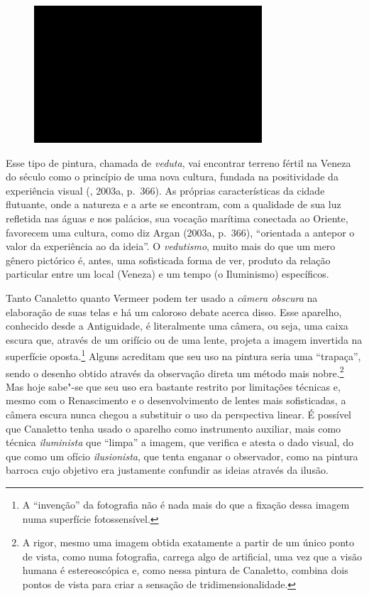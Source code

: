 \begin{figure}[!ht]
\centering
 \includegraphics[width=85mm]{./imgs/im1.jpg}
\caption{\tiny{}}
\end{figure}

Esse tipo de pintura, chamada de \emph{veduta}, vai encontrar terreno
fértil na Veneza do século  como o princípio de uma nova cultura,
fundada na positividade da experiência visual (, 2003a, p.~366). As
próprias características da cidade flutuante, onde a natureza e a arte
se encontram, com a qualidade de sua luz refletida nas águas e nos
palácios, sua vocação marítima conectada ao Oriente, favorecem uma
cultura, como diz Argan (2003a, p.~366), ``orientada a antepor o valor
da experiência ao da ideia''. O \emph{vedutismo}, muito mais do que um
mero gênero pictórico é, antes, uma sofisticada forma de ver, produto da
relação particular entre um local (Veneza) e um tempo (o Iluminismo)
específicos.

Tanto Canaletto quanto Vermeer podem ter usado a \emph{câmera obscura}
na elaboração de suas telas e há um caloroso debate acerca disso. Esse
aparelho, conhecido desde a Antiguidade, é literalmente uma câmera, ou
seja, uma caixa escura que, através de um orifício ou de uma lente,
projeta a imagem invertida na superfície oposta.\footnote{A ``invenção''
  da fotografia não é nada mais do que a fixação dessa imagem numa
  superfície fotossensível.} Alguns acreditam que seu uso na pintura
seria uma ``trapaça'', sendo o desenho obtido através da observação
direta um método mais nobre.\footnote{A rigor, mesmo uma imagem obtida
  exatamente a partir de um único ponto de vista, como numa fotografia,
  carrega algo de artificial, uma vez que a visão humana é
  estereoscópica e, como nessa pintura de Canaletto, combina dois pontos
  de vista para criar a sensação de tridimensionalidade.} Mas hoje
sabe"-se que seu uso era bastante restrito por limitações técnicas e,
mesmo com o Renascimento e o desenvolvimento de lentes mais
sofisticadas, a câmera escura nunca chegou a substituir o uso da
perspectiva linear. É possível que Canaletto tenha usado o aparelho como
instrumento auxiliar, mais como técnica \emph{iluminista} que ``limpa''
a imagem, que verifica e atesta o dado visual, do que como um ofício
\emph{ilusionista}, que tenta enganar o observador, como na pintura
barroca cujo objetivo era justamente confundir as ideias através da
ilusão.

